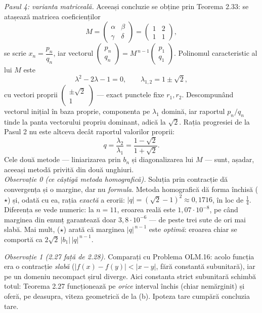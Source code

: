 \emph{Pasul 4: varianta matriceală.} Aceeași concluzie se obține prin Teorema 2.33: se atașează matricea coeficienților
\[ M=\begin{pmatrix}\alpha & \beta\\ \gamma & \delta\end{pmatrix}=\begin{pmatrix}1 & 2\\ 1 & 1\end{pmatrix} , \]
se scrie $x_{n}=\dfrac{p_{n}}{q_{n}}$, iar vectorul $\begin{pmatrix}p_{n}\\ q_{n}\end{pmatrix}=M^{\,n-1}\begin{pmatrix}p_{1}\\ q_{1}\end{pmatrix}$. Polinomul caracteristic al lui $M$ este
\[ \lambda^{2}-2\lambda-1=0,\qquad \lambda_{1,2}=1\pm\sqrt2 , \]
cu vectori proprii $\begin{pmatrix}\pm\sqrt2\\ 1\end{pmatrix}$ --- exact punctele fixe $r_{1},r_{2}$. Descompunând vectorul inițial în baza proprie, componenta pe $\lambda_{1}$ domină, iar raportul $p_{n}/q_{n}$ tinde la panta vectorului propriu dominant, adică la $\sqrt2$. Rația progresiei de la Pasul 2 nu este altceva decât raportul valorilor proprii:
\[ q=\frac{\lambda_{2}}{\lambda_{1}}=\frac{1-\sqrt2}{1+\sqrt2} . \]
Cele două metode --- liniarizarea prin $b_{n}$ și diagonalizarea lui $M$ --- sunt, așadar, aceeași metodă privită din două unghiuri.\\[2pt]
\emph{Observație 0 (ce câștigă metoda homografică).} Soluția prin contracție dă convergența și o margine, dar nu \emph{formula}. Metoda homografică dă forma închisă ($\star$) și, odată cu ea, rația \emph{exactă} a erorii: $|q|=(\sqrt2-1)^{2}\approx0{,}1716$, în loc de $\frac14$. Diferența se vede numeric: la $n=11$, eroarea reală este $1{,}07\cdot10^{-8}$, pe când marginea din enunț garantează doar $3{,}8\cdot10^{-6}$ --- de peste trei sute de ori mai slabă. Mai mult, ($\star$) arată că marginea $|q|^{\,n-1}$ este \emph{optimă}: eroarea chiar se comportă ca $2\sqrt2\,|b_{1}|\,|q|^{\,n-1}$.

\emph{Observație 1 (2.27 față de 2.28).} Comparați cu Problema OLM.16: acolo funcția era o contracție \emph{slabă} ($|f(x)-f(y)|<|x-y|$, fără constantă subunitară), iar pe un domeniu necompact șirul diverge. Aici constanta strict subunitară schimbă totul: Teorema 2.27 funcționează pe \emph{orice} interval închis (chiar nemărginit) și oferă, pe deasupra, viteza geometrică de la (b). Ipoteza tare cumpără concluzia tare.

